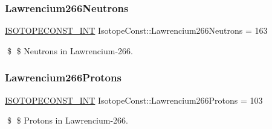 \subsubsection{\texorpdfstring{Lawrencium266\+Neutrons}{Lawrencium266Neutrons}}
{\footnotesize\ttfamily \mbox{\hyperlink{group___isotope_const-_macros_ga5f18360b3e99483a35c32d789e62621c}{I\+S\+O\+T\+O\+P\+E\+C\+O\+N\+S\+T\+\_\+\+I\+NT}} Isotope\+Const\+::\+Lawrencium266\+Neutrons = 163}

\$ \$ Neutrons in Lawrencium-\/266. \mbox{\label{group___isotope_const-_lawrencium-_lr266_ga63227f1cb92f700365effb06707a8ad9}} 
\subsubsection{\texorpdfstring{Lawrencium266\+Protons}{Lawrencium266Protons}}
{\footnotesize\ttfamily \mbox{\hyperlink{group___isotope_const-_macros_ga5f18360b3e99483a35c32d789e62621c}{I\+S\+O\+T\+O\+P\+E\+C\+O\+N\+S\+T\+\_\+\+I\+NT}} Isotope\+Const\+::\+Lawrencium266\+Protons = 103}

\$ \$ Protons in Lawrencium-\/266. 